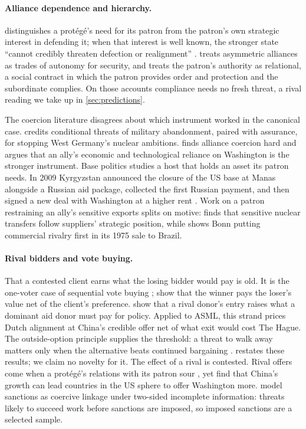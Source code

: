 \paragraph{Alliance dependence and hierarchy.} \citet{snyder1984security, snyder1997alliance} distinguishes a protégé's need for its patron from the patron's own strategic interest in defending it; when that interest is well known, the stronger state ``cannot credibly threaten defection or realignment'' \citep[472--473]{snyder1984security}. \citet{morrow1991alliances} treats asymmetric alliances as trades of autonomy for security, and \citet{lake2009hierarchy} treats the patron's authority as relational, a social contract in which the patron provides order and protection and the subordinate complies. On those accounts compliance needs no fresh threat, a rival reading we take up in \cref{sec:predictions}.

The coercion literature disagrees about which instrument worked in the canonical case. \citet{gerzhoy2015alliance} credits conditional threats of military abandonment, paired with assurance, for stopping West Germany's nuclear ambitions. \citet{lanoszka2018atomic} finds alliance coercion hard and argues that an ally's economic and technological reliance on Washington is the stronger instrument. Base politics studies a host that holds an asset its patron needs. In 2009 Kyrgyzstan announced the closure of the US base at Manas alongside a Russian aid package, collected the first Russian payment, and then signed a new deal with Washington at a higher rent \citep[ch.~7]{cooley2012great}. Work on a patron restraining an ally's sensitive exports splits on motive: \citet{kroenig2009exporting} finds that sensitive nuclear transfers follow suppliers' strategic position, while \citet{gray2012commercial} shows Bonn putting commercial rivalry first in its 1975 sale to Brazil.

\paragraph{Rival bidders and vote buying.} That a contested client earns what the losing bidder would pay is old. It is the one-voter case of sequential vote buying \citep{groseclose1996buying}; \citet[Prop.~2]{dekel2008vote} show that the winner pays the loser's value net of the client's preference. \citet{bueno2016competition} show that a rival donor's entry raises what a dominant aid donor must pay for policy. Applied to ASML, this strand prices Dutch alignment at China's credible offer net of what exit would cost The Hague. The outside-option principle supplies the threshold: a threat to walk away matters only when the alternative beats continued bargaining \citep{shaked1984involuntary, sutton1986noncooperative, binmore1989outside}.  restates these results; we claim no novelty for it. The effect of a rival is contested. Rival offers come when a protégé's relations with its patron sour \citep{yang2026major}, yet \citet{camboni2025spheres} find that China's growth can lead countries in the US sphere to offer Washington more. \citet{lacy2004theory} model sanctions as coercive linkage under two-sided incomplete information: threats likely to succeed work before sanctions are imposed, so imposed sanctions are a selected sample.

